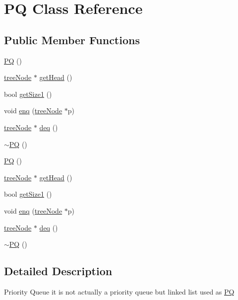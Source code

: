 \hypertarget{class_p_q}{\section{\-P\-Q \-Class \-Reference}
\label{class_p_q}
}
\subsection*{\-Public \-Member \-Functions}
\begin{DoxyCompactItemize}
\item 
\hyperlink{class_p_q_a810e2adb05c00fedb40e8422e4c90553}{\-P\-Q} ()
\item 
\hyperlink{structtree_node}{tree\-Node} $\ast$ \hyperlink{class_p_q_af6bab1c5abc695a14866e07a5c790701}{get\-Head} ()
\item 
bool \hyperlink{class_p_q_a9705ba62fc2dd15fcd960ddcb3d709e9}{get\-Size1} ()
\item 
void \hyperlink{class_p_q_aa2911a1e102302f17639b636bd6bb41b}{enq} (\hyperlink{structtree_node}{tree\-Node} $\ast$p)
\item 
\hyperlink{structtree_node}{tree\-Node} $\ast$ \hyperlink{class_p_q_ad18a3b93817850ba0e5cd60df118f9a4}{deq} ()
\item 
\hyperlink{class_p_q_aecb31dbe337860e61884932830be510b}{$\sim$\-P\-Q} ()
\item 
\hyperlink{class_p_q_a810e2adb05c00fedb40e8422e4c90553}{\-P\-Q} ()
\item 
\hyperlink{structtree_node}{tree\-Node} $\ast$ \hyperlink{class_p_q_af6bab1c5abc695a14866e07a5c790701}{get\-Head} ()
\item 
bool \hyperlink{class_p_q_a9705ba62fc2dd15fcd960ddcb3d709e9}{get\-Size1} ()
\item 
void \hyperlink{class_p_q_aa2911a1e102302f17639b636bd6bb41b}{enq} (\hyperlink{structtree_node}{tree\-Node} $\ast$p)
\item 
\hyperlink{structtree_node}{tree\-Node} $\ast$ \hyperlink{class_p_q_ad18a3b93817850ba0e5cd60df118f9a4}{deq} ()
\item 
\hyperlink{class_p_q_aecb31dbe337860e61884932830be510b}{$\sim$\-P\-Q} ()
\end{DoxyCompactItemize}


\subsection{\-Detailed \-Description}
\-Priority \-Queue it is not actually a priority queue but linked list used as \hyperlink{class_p_q}{\-P\-Q} 

